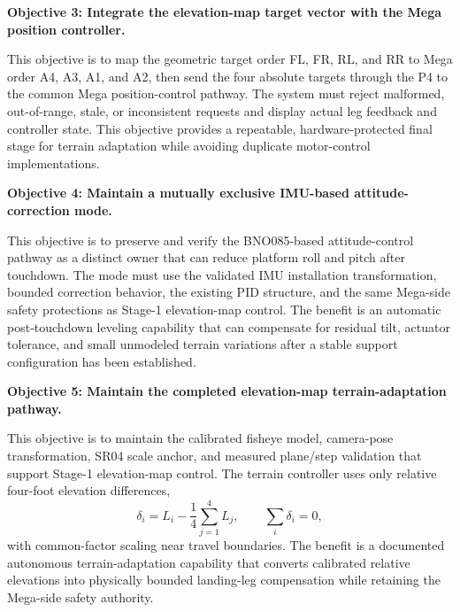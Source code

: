 \textbf{Objective 3: Integrate the elevation-map target vector with the Mega position controller.}

This objective is to map the geometric target order FL, FR, RL, and RR to Mega order A4, A3, A1, and A2, then send the four absolute targets through the P4 to the common Mega position-control pathway. The system must reject malformed, out-of-range, stale, or inconsistent requests and display actual leg feedback and controller state. This objective provides a repeatable, hardware-protected final stage for terrain adaptation while avoiding duplicate motor-control implementations.

\textbf{Objective 4: Maintain a mutually exclusive IMU-based attitude-correction mode.}

This objective is to preserve and verify the BNO085-based attitude-control pathway as a distinct owner that can reduce platform roll and pitch after touchdown. The mode must use the validated IMU installation transformation, bounded correction behavior, the existing PID structure, and the same Mega-side safety protections as Stage-1 elevation-map control. The benefit is an automatic post-touchdown leveling capability that can compensate for residual tilt, actuator tolerance, and small unmodeled terrain variations after a stable support configuration has been established.

\textbf{Objective 5: Maintain the completed elevation-map terrain-adaptation pathway.}

This objective is to maintain the calibrated fisheye model, camera-pose transformation, SR04 scale anchor, and measured plane/step validation that support Stage-1 elevation-map control. The terrain controller uses only relative four-foot elevation differences,
\[
\delta_i=L_i-\frac{1}{4}\sum_{j=1}^{4}L_j,
\qquad \sum_i\delta_i=0,
\]
with common-factor scaling near travel boundaries. The benefit is a documented autonomous terrain-adaptation capability that converts calibrated relative elevations into physically bounded landing-leg compensation while retaining the Mega-side safety authority.
